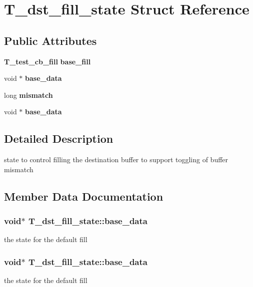 \section{T\_\-dst\_\-fill\_\-state Struct Reference}
\label{structT__dst__fill__state}
\subsection*{Public Attributes}
\begin{CompactItemize}
\item 
{\bf T\_\-test\_\-cb\_\-fill} {\bf base\_\-fill}
\item 
void $\ast$ {\bf base\_\-data}
\item 
long {\bf mismatch}
\item 
void $\ast$ {\bf base\_\-data}
\end{CompactItemize}


\subsection{Detailed Description}
state to control filling the destination buffer to support toggling of buffer mismatch 



\subsection{Member Data Documentation}
\subsubsection{\setlength{\rightskip}{0pt plus 5cm}void$\ast$ T\_\-dst\_\-fill\_\-state::base\_\-data}\label{structT__dst__fill__state_m3}


the state for the default fill 
\subsubsection{\setlength{\rightskip}{0pt plus 5cm}void$\ast$ T\_\-dst\_\-fill\_\-state::base\_\-data}\label{structT__dst__fill__state_m1}


the state for the default fill 
